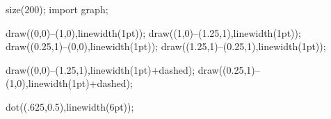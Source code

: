 	size(200);  
    import graph;

    draw((0,0)--(1,0),linewidth(1pt));
    draw((1,0)--(1.25,1),linewidth(1pt));
    draw((0.25,1)--(0,0),linewidth(1pt));
    draw((1.25,1)--(0.25,1),linewidth(1pt));
    
	draw((0,0)--(1.25,1),linewidth(1pt)+dashed);
	draw((0.25,1)--(1,0),linewidth(1pt)+dashed);
    
    dot((.625,0.5),linewidth(6pt));